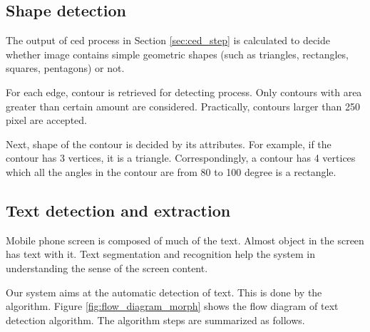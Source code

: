\subsection{Shape detection}
\label{sec:shape_detect}
The output of \acrshort{ced} process in Section \ref{sec:ced_step} is calculated to decide whether image contains simple geometric shapes (such as triangles, rectangles, squares, pentagons) or not.

For each edge, contour is retrieved for detecting process. Only contours with area greater than certain amount are considered. Practically, contours larger than 250 pixel are accepted.

Next, shape of the contour is decided by its attributes. For example, if the contour has 3 vertices, it is a triangle. Correspondingly, a contour has 4 vertices which all the angles in the contour are from 80 to 100 degree is a rectangle.

\subsection{Text detection and extraction}
\label{sec:text_detect}
Mobile phone screen is composed of much of the text. Almost object in the screen has text with it. Text segmentation and recognition help the system in understanding the sense of the screen content.

Our system aims at the automatic detection of text. This is done by the algorithm. Figure \ref{fig:flow_diagram_morph} shows the flow diagram of text detection algorithm. The algorithm steps are summarized as follows.

